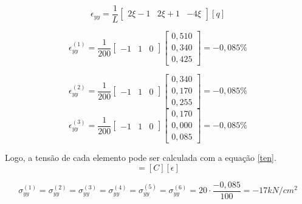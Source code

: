 \documentclass{article} %
\begin{document}
\begin{equation*}
\epsilon_{yy}=\frac{1}{L}\begin{bmatrix}
2\xi-1&2\xi+1&-4\xi
\end{bmatrix}[q]
\end{equation*}

\begin{equation}
\epsilon_{yy}^{(1)}=\frac{1}{200}\begin{bmatrix}
-1&1&0
\end{bmatrix}\begin{bmatrix}
0,510\\0,340\\0,425
\end{bmatrix}=-0,085\%
\end{equation}

\begin{equation}
\epsilon_{yy}^{(2)}=\frac{1}{200}\begin{bmatrix}
-1&1&0
\end{bmatrix}\begin{bmatrix}
0,340\\0,170\\0,255
\end{bmatrix}=-0,085\%
\end{equation}
\begin{equation}
\epsilon_{yy}^{(3)}=\frac{1}{200}\begin{bmatrix}
-1&1&0
\end{bmatrix}\begin{bmatrix}
0,170\\0,000\\0,085
\end{bmatrix}=-0,085\%
\end{equation}


\indent Logo, a tensão de cada elemento pode ser calculada com a equação \ref{ten}.
\begin{equation*}
[\sigma]=[C][\epsilon]
\end{equation*}

\begin{equation}
\sigma_{yy}^{(1)}=\sigma_{yy}^{(2)}=\sigma_{yy}^{(3)}=\sigma_{yy}^{(4)}=\sigma_{yy}^{(5)}=\sigma_{yy}^{(6)}=20\cdot \frac{-0,085}{100}=-17 kN/cm^2
\end{equation}
\end{document}
